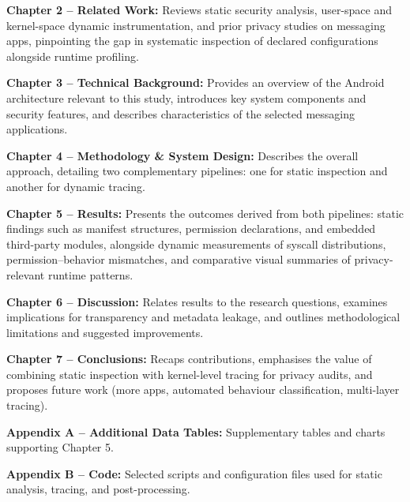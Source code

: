 \documentclass[a4paper,12pt]{report}
\begin{document}
\vspace{0.4em}
\textbf{Chapter 2 – Related Work:} Reviews static security analysis, user-space and kernel-space dynamic instrumentation, and prior privacy studies on messaging apps, pinpointing the gap in systematic inspection of declared configurations alongside runtime profiling.

\vspace{0.4em}
\textbf{Chapter 3 – Technical Background:} Provides an overview of the Android architecture relevant to this study, introduces key system components and security features, and describes characteristics of the selected messaging applications.

\vspace{0.4em}
\textbf{Chapter 4 – Methodology \& System Design:} Describes the overall approach, detailing two complementary pipelines: one for static inspection and another for dynamic tracing.

\vspace{0.4em}
\textbf{Chapter 5 – Results:} Presents the outcomes derived from both pipelines: static findings such as manifest structures, permission declarations, and embedded third-party modules, alongside dynamic measurements of syscall distributions, permission–behavior mismatches, and comparative visual summaries of privacy-relevant runtime patterns.

\vspace{0.4em}
\textbf{Chapter 6 – Discussion:} Relates results to the research questions, examines implications for transparency and metadata leakage, and outlines methodological limitations and suggested improvements.

\vspace{0.4em}
\textbf{Chapter 7 – Conclusions:} Recaps contributions, emphasises the value of combining static inspection with kernel-level tracing for privacy audits, and proposes future work (more apps, automated behaviour classification, multi-layer tracing).

\vspace{0.4em}
\textbf{Appendix A – Additional Data Tables:} Supplementary tables and charts supporting Chapter 5.

\vspace{0.4em}
\textbf{Appendix B – Code:} Selected scripts and configuration files used for static analysis, tracing, and post-processing.

\end{document}
